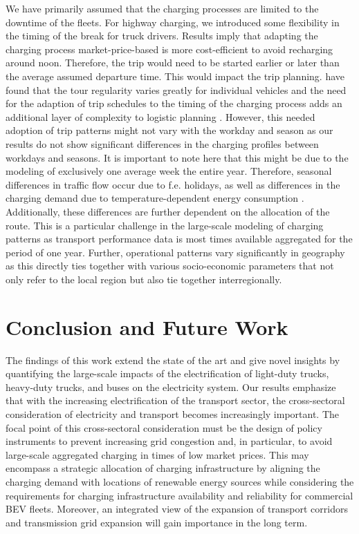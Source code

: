\documentclass[final,10pt]{elsarticle}
\begin{document}
            We have primarily assumed that the charging processes are limited to the downtime of the fleets. For highway charging, we introduced some flexibility in the timing of the break for truck drivers. Results imply that adapting the charging process market-price-based is more cost-efficient to avoid recharging around noon. Therefore, the trip would need to be started earlier or later than the average assumed departure time. This would impact the trip planning. \citeauthor{Scherrer2024Requirements} have found that the tour regularity varies greatly for individual vehicles and the need for the adaption of trip schedules to the timing of the charging process adds an additional layer of complexity to logistic planning \cite{Scherrer2024Requirements}. However, this needed adoption of trip patterns might not vary with the workday and season as our results do not show significant differences in the charging profiles between workdays and seasons. It is important to note here that this might be due to the modeling of exclusively one average week the entire year. Therefore, seasonal differences in traffic flow  occur due to f.e. holidays, as well as differences in the charging demand due to temperature-dependent energy consumption . Additionally, these differences are further dependent on the allocation of the route. This is a particular challenge in the large-scale modeling of charging patterns as transport performance data is most times available aggregated for the period of one year. Further, operational patterns vary significantly in geography as this directly ties together with various socio-economic parameters that not only refer to the local region but also tie together interregionally. 


        \section{Conclusion and Future Work}

        The findings of this work extend the state of the art and give novel insights by quantifying the large-scale impacts of the electrification of light-duty trucks, heavy-duty trucks, and buses on the electricity system. Our results emphasize that with the increasing electrification of the transport sector, the cross-sectoral consideration of electricity and transport becomes increasingly important. The focal point of this cross-sectoral consideration must be the design of policy instruments to prevent increasing grid congestion and, in particular, to avoid large-scale aggregated charging in times of low market prices.
        This may encompass a strategic allocation of charging infrastructure by aligning the charging demand with locations of renewable energy sources while considering the requirements for charging infrastructure availability and reliability for commercial \ac{BEV} fleets. Moreover, an integrated view of the expansion of transport corridors and transmission grid expansion will gain importance in the long term. 
        
\end{document}
